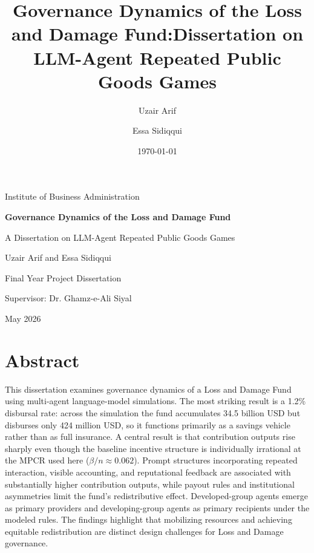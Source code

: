 \documentclass[12pt,letterpaper]{report}
\title{Governance Dynamics of the Loss and Damage Fund:\A Dissertation on LLM-Agent Repeated Public Goods Games}
\author{Uzair Arif \and Essa Sidiqqui}
\date{\today}
\begin{document}
\hypersetup{pageanchor=false}
\begin{titlepage}
\centering
{\Large Institute of Business Administration\par}
\vspace{1.2cm}
{\huge\bfseries Governance Dynamics of the Loss and Damage Fund\par}
\vspace{0.3cm}
{\Large A Dissertation on LLM-Agent Repeated Public Goods Games\par}
\vspace{1.5cm}
{\Large Uzair Arif and Essa Sidiqqui\par}
\vspace{0.3cm}
{\large Final Year Project Dissertation\par}
\vfill
{\large Supervisor: Dr. Ghamz-e-Ali Siyal\par}
\vspace{0.5cm}
{\large May 2026\par}
\end{titlepage}
\hypersetup{pageanchor=true}


\chapter*{Abstract}
This dissertation examines governance dynamics of a Loss and Damage Fund using multi-agent language-model simulations. The most striking result is a 1.2\% disbursal rate: across the simulation the fund accumulates 34.5 billion USD but disburses only 424 million USD, so it functions primarily as a savings vehicle rather than as full insurance. A central result is that contribution outputs rise sharply even though the baseline incentive structure is individually irrational at the MPCR used here ($\beta/n \approx 0.062$). Prompt structures incorporating repeated interaction, visible accounting, and reputational feedback are associated with substantially higher contribution outputs, while payout rules and institutional asymmetries limit the fund's redistributive effect. Developed-group agents emerge as primary providers and developing-group agents as primary recipients under the modeled rules. The findings highlight that mobilizing resources and achieving equitable redistribution are distinct design challenges for Loss and Damage governance.

\tableofcontents
\listoffigures
\listoftables
\clearpage
{}
\end{document}
